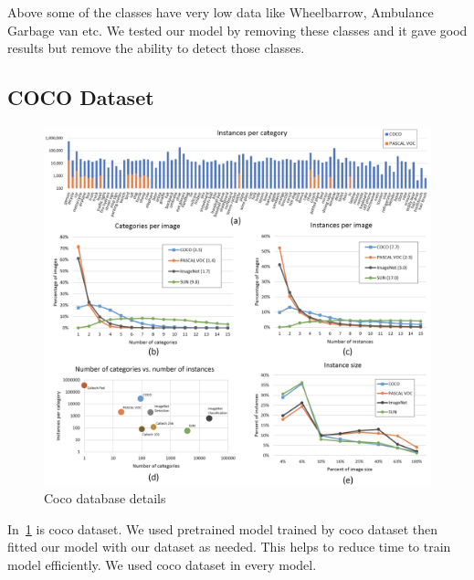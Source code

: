 Above some of the classes have very low data like Wheelbarrow, Ambulance Garbage van etc. We tested our model by removing these classes and it gave good results but remove the ability to detect those classes.  
\newpage
\subsection{COCO Dataset}

\begin{figure}[ht]
    \centering
    \includegraphics[max width=\textwidth]{images/ours/coco-details.png}
   \caption[Coco database details]{ Coco database details }
    \label{fig:coco_details}
\end{figure}

In~\ref{fig:coco_details} is coco dataset. We used pretrained model trained by coco dataset then fitted our model with our dataset as needed. This helps to reduce time to train model efficiently. We used coco dataset in every model.


